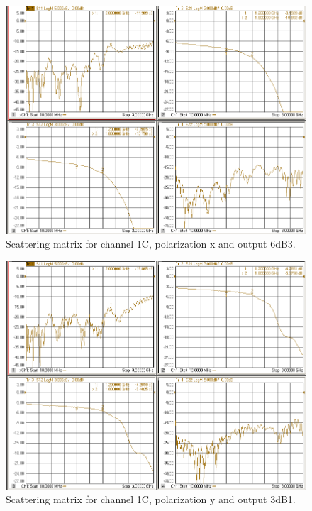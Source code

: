 \documentclass[12pt,a4paper,oneside]{article}
\begin{document}
\begin{figure}[H]
\centering
\includegraphics[width=0.9\linewidth]{VNA_results/1Cx_6dB3.png}
\caption{Scattering matrix for channel 1C, polarization x and output 6dB3.}
\label{fig:1Cx_6dB3}
\end{figure}


\begin{figure}[H]
\centering
\includegraphics[width=0.9\linewidth]{VNA_results/1Cy_3dB1.png}
\caption{Scattering matrix for channel 1C, polarization y and output 3dB1.}
\label{fig:1Cy_3dB1}
\end{figure}
\end{document}
